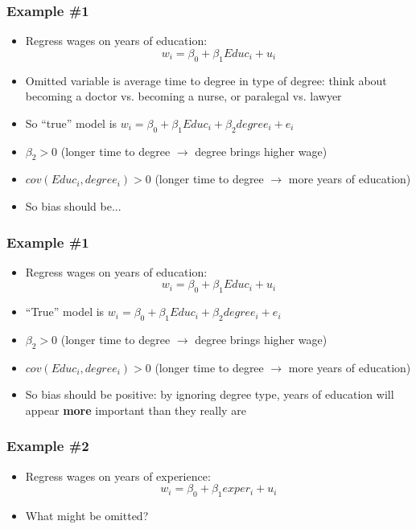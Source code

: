 \documentclass[aspectratio=169]{beamer}
\begin{document}
\begin{frame}
    \frametitle{Example \#1}
    \begin{itemize}
        \item Regress wages on years of education:
        $$ 
            w_i = \beta_0 + \beta_1 Educ_i + u_i
        $$
        \item Omitted variable is average time to degree in type of degree: think about becoming a doctor vs. becoming a nurse, or paralegal vs. lawyer
        \item So ``true'' model is $w_i = \beta_0 + \beta_1 Educ_i + \beta_2 degree_i + e_i$
        \item $\beta_2 > 0$ (longer time to degree $\rightarrow$ degree brings higher wage)
        \item $cov(Educ_i, degree_i) > 0 $ (longer time to degree $\rightarrow$ more years of education)
        \item So bias should be...
    \end{itemize}
\end{frame}

\begin{frame}
    \frametitle{Example \#1}
    \begin{itemize}
        \item Regress wages on years of education:
        $$ 
            w_i = \beta_0 + \beta_1 Educ_i + u_i
        $$
        \item ``True'' model is $w_i = \beta_0 + \beta_1 Educ_i + \beta_2 degree_i + e_i$
        \item $\beta_2 > 0$ (longer time to degree $\rightarrow$ degree brings higher wage)
        \item $cov(Educ_i, degree_i) > 0 $ (longer time to degree $\rightarrow$ more years of education)
        \item So bias should be positive: by ignoring degree type, years of education will appear \textbf{more} important than they really are
    \end{itemize}
\end{frame}


\begin{frame}
    \frametitle{Example \#2}
    \begin{itemize}
        \item Regress wages on years of experience:
        $$ 
            w_i = \beta_0 + \beta_1 exper_i + u_i
        $$
        \item What might be omitted?
    \end{itemize}
\end{frame}
\end{document}

